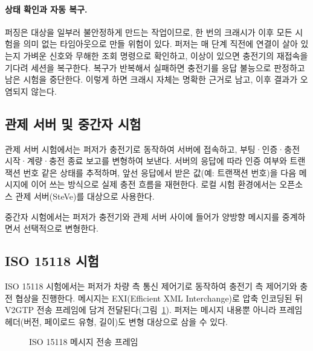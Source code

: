 \paragraph{상태 확인과 자동 복구.}
퍼징은 대상을 일부러 불안정하게 만드는 작업이므로, 한 번의 크래시가 이후 모든 시험을 의미 없는 타임아웃으로 만들 위험이 있다.
퍼저는 매 단계 직전에 연결이 살아 있는지 가벼운 신호와 무해한 조회 명령으로 확인하고, 이상이 있으면 충전기의 재접속을 기다려 세션을 복구한다.
복구가 반복해서 실패하면 충전기를 응답 불능으로 판정하고 남은 시험을 중단한다.
이렇게 하면 크래시 자체는 명확한 근거로 남고, 이후 결과가 오염되지 않는다.

\subsection{관제 서버 및 중간자 시험}

관제 서버 시험에서는 퍼저가 충전기로 동작하여 서버에 접속하고, 부팅·인증·충전 시작·계량·충전 종료 보고를 변형하여 보낸다.
서버의 응답에 따라 인증 여부와 트랜잭션 번호 같은 상태를 추적하며, 앞선 응답에서 받은 값(예: 트랜잭션 번호)을 다음 메시지에 이어 쓰는 방식으로 실제 충전 흐름을 재현한다.
로컬 시험 환경에서는 오픈소스 관제 서버(SteVe)를 대상으로 사용한다.

중간자 시험에서는 퍼저가 충전기와 관제 서버 사이에 들어가 양방향 메시지를 중계하면서 선택적으로 변형한다.

\subsection{ISO 15118 시험}

ISO 15118 시험에서는 퍼저가 차량 측 통신 제어기로 동작하여 충전기 측 제어기와 충전 협상을 진행한다.
메시지는 EXI(Efficient XML Interchange)로 압축 인코딩된 뒤 V2GTP 전송 프레임에 담겨 전달된다(그림~\ref{fig:v2gtp}).
퍼저는 메시지 내용뿐 아니라 프레임 헤더(버전, 페이로드 유형, 길이)도 변형 대상으로 삼을 수 있다.

\begin{figure}[H]
\centering
{}
\caption{ISO 15118 메시지 전송 프레임}
\label{fig:v2gtp}
\end{figure}

